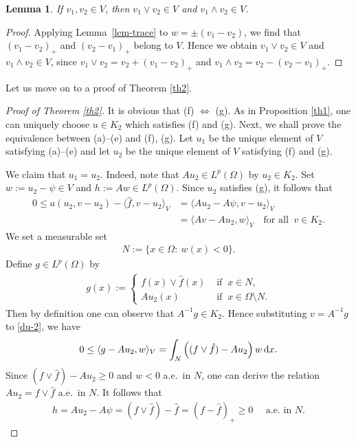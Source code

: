 \documentclass[reqno,10pt]{amsart}
\newtheorem{Lem}[Th]{Lemma}
\begin{document}
\begin{Lem}\label{lem-min}
If $v_1, v_2\in V$, then $v_1 \vee v_2 \in V$ and $v_1 \wedge v_2 \in V$.
\end{Lem}

\begin{proof}
Applying Lemma~\ref{lem-trace} to $w = \pm (v_1 - v_2)$,
we find that $(v_1-v_2)_+$ and $(v_2-v_1)_+$ belong to $V$.
Hence we obtain $v_1 \vee v_2 \in V$ and $v_1 \wedge v_2 \in V$,
since $v_1 \vee v_2 = v_2+(v_1-v_2)_+$ and $v_1 \wedge v_2 =v_2-(v_2-v_1)_+$.
\end{proof}

Let us move on to a proof of Theorem \ref{th2}.

\begin{proof}[Proof of Theorem \ref{th2}]
It is obvious that (f) $\Leftrightarrow$ (g).
As in Proposition \ref{th1}, one can uniquely choose $u \in K_2$ which satisfies (f)
 and (g). Next, we shall prove the equivalence between (a)--(e) and (f),
 (g). Let $u_1$ be the unique element of $V$ satisfying (a)--(e) and let
 $u_2$ be the unique element of $V$ satisfying (f) and (g). 

We claim that $u_1=u_2$. 
Indeed, note that $Au_2\in L^p(\Omega)$ by $u_2\in K_2$.
Set $w:=u_2-\psi\in V$ and $h:=Aw\in L^p(\Omega)$.
Since $u_2$ satisfies (g), it follows that 
\begin{align}\label{du-2}
0 \leq a(u_2, v - u_2) - \langle \hat f , v - u_2 \rangle_V
&= \langle Au_2 - A\psi, v-u_2 \rangle_V \nonumber \\
&= \langle Av-Au_2,w\rangle_V
\quad
\mbox{for all }\ v\in K_2.
\end{align}
We set a measurable set
\begin{align*}
N:=\{x\in \Omega \colon ~w(x)<0\}.
\end{align*}
Define $g\in L^p(\Omega)$ by
\begin{align*}
g(x):=\left\{
\begin{array}{ll}
f(x) \vee \hat{f}(x) &\mbox{ if } \ x\in N,\\
Au_2(x)&\mbox{ if } \ x\in \Omega\setminus N.
\end{array}
\right.
\end{align*}
Then by definition one can observe that $A^{-1}g\in K_2$.
Hence substituting $v=A^{-1}g$ to \eqref{du-2}, we have
$$
0 \leq \langle g - Au_2, w \rangle_V = \int_N \left((f \vee \hat
 f)-Au_2\right)w\,{\text{\rm d}} x.
$$
Since $(f \vee \hat f) -Au_2\ge 0$ and $w<0$ a.e.~in $N$, one can derive
 the relation $Au_2= f \vee \hat f$ a.e.~in $N$. It follows that
\begin{align*}
h=Au_2-A\psi= (f \vee \hat f) - \hat f = (f-\hat{f})_+\ge 0
\quad
\mbox{ a.e.~in }N.
\end{align*}


\end{proof}
\end{document}
